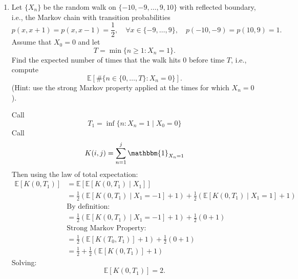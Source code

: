 \documentclass[10pt, oneside]{article}
\newcommand{\bbE}{\mathbb{E}}
\theoremstyle{definition}
\begin{document}
\begin{enumerate}
    \item Let $\{X_n\}$ be the random walk on $\{-10, -9, \ldots, 9, 10\}$ with reflected boundary, i.e., the Markov chain with transition probabilities
        $$
        p(x, x+1) = p(x, x-1) = \frac{1}{2}, \quad \forall x \in \{-9, \ldots, 9\}, \quad p(-10, -9) = p(10, 9) = 1.
        $$
        Assume that $X_0 = 0$ and let
        $$
        T = \min \{ n \geq 1 : X_n = 1 \}.
        $$
        Find the expected number of times that the walk hits 0 before time $T$, i.e., compute
        $$
        \mathbb{E}\left[ \#\{n \in \{0, \ldots, T\} : X_n = 0\} \right].
        $$
        (Hint: use the strong Markov property applied at the times for which $X_n = 0$).
    \begin{solution}
        Call 
        \[T_1 = \inf\{n  : X_n = 1 \mid X_0 = 0\}\] Call
        \[K(i, j) = \sum_{n=1}^j \mathbbm{1}_{X_n = 1}\]
        Then using the law of total expectation:
        \begin{align*}
            \bbE[K(0, T_1)] &= \bbE[\bbE[K(0,T_1) \mid X_1]]\\
            &= \frac{1}{2}(\bbE[K(0, T_1)\mid X_1 = -1] + 1) + \frac{1}{2}(\bbE[K(0,T_1) \mid X_1 = 1] +1)\\
            &\text{By definition:}\\
            &= \frac{1}{2}(\bbE[K(0, T_1)\mid X_1 = -1] + 1) + \frac{1}{2}(0 +1)\\
            &\text{Strong Markov Property:}\\
            &= \frac{1}{2}(\bbE[K(T_0, T_1)] + 1) + \frac{1}{2}(0 +1)\\
            &= \frac{1}{2} + \frac{1}{2}(\bbE[K(0, T_1)] +1)
        \end{align*}
        Solving:
        \[\bbE[K(0, T_1)] = 2.\] 
    \end{solution}


\end{enumerate}
\end{document}
